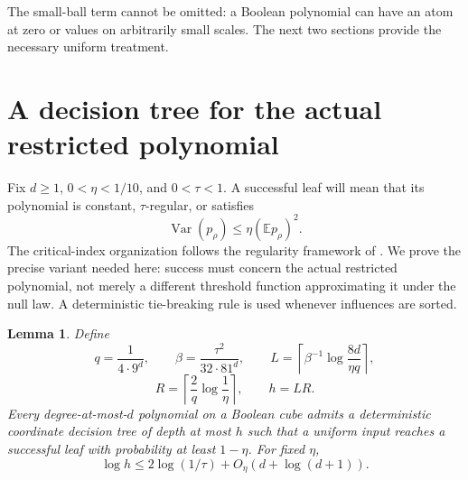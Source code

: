 \documentclass[11pt]{article}
\newcommand{\E}{\mathbb E}
\newcommand{\Var}{\operatorname{Var}}
\newcommand{\1}{\mathbf 1}
\newtheorem{lemma}[theorem]{Lemma}
\theoremstyle{definition}
\theoremstyle{remark}
\numberwithin{equation}{section}
\begin{document}
The small-ball term cannot be omitted: a Boolean polynomial can have an atom at zero or values on arbitrarily small scales. The next two sections provide the necessary uniform treatment.

\section{A decision tree for the actual restricted polynomial}

Fix $d\ge1$, $0<\eta<1/10$, and $0<\tau<1$. A successful leaf will mean that its polynomial is constant, $\tau$-regular, or satisfies
\begin{equation}\label{eq:mean-dominated}
 \Var(p_\rho)\le\eta(\E p_\rho)^2.
\end{equation}
The critical-index organization follows the regularity framework of \cite{DSTW}. We prove the precise variant needed here: success must concern the actual restricted polynomial, not merely a different threshold function approximating it under the null law. A deterministic tie-breaking rule is used whenever influences are sorted.

\begin{lemma}\label{lem:tree}
Define
\[
 q=\frac1{4\cdot9^d},\qquad
 \beta=\frac{\tau^2}{32\cdot81^d},\qquad
 L=\left\lceil\beta^{-1}\log\frac{8d}{\eta q}\right\rceil,
\]
\[
 R=\left\lceil\frac2q\log\frac1\eta\right\rceil,
 \qquad h=LR.
\]
Every degree-at-most-$d$ polynomial on a Boolean cube admits a deterministic coordinate decision tree of depth at most $h$ such that a uniform input reaches a successful leaf with probability at least $1-\eta$. For fixed $\eta$,
\begin{equation}\label{eq:depth}
 \log h\le2\log(1/\tau)+O_\eta(d+\log(d+1)).
\end{equation}
\end{lemma}
\end{document}
